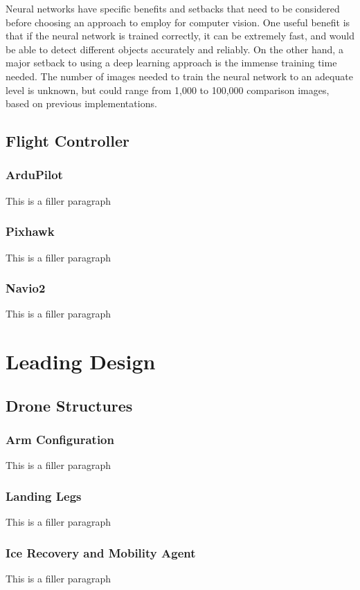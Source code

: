 		Neural networks have specific benefits and setbacks that need to be considered before choosing an approach to employ for computer vision. One useful benefit is that if the neural network is trained correctly, it can be extremely fast, and would be able to detect different objects accurately and reliably. On the other hand, a major setback to using a deep learning approach is the immense training time needed. The number of images needed to train the neural network to an adequate level is unknown, but could range from 1,000 to 100,000 comparison images, based on previous implementations.

	\subsection{Flight Controller}
		\subsubsection{ArduPilot}
			This is a filler paragraph

		\subsubsection{Pixhawk}
			This is a filler paragraph

		\subsubsection{Navio2}
			This is a filler paragraph

\section{Leading Design}\label{PL:Deployment:LeadingDesign}
	\subsection{Drone Structures}
		\subsubsection{Arm Configuration}
			This is a filler paragraph

		\subsubsection{Landing Legs}
			This is a filler paragraph
	
		\subsubsection{Ice Recovery and Mobility Agent}
			This is a filler paragraph

